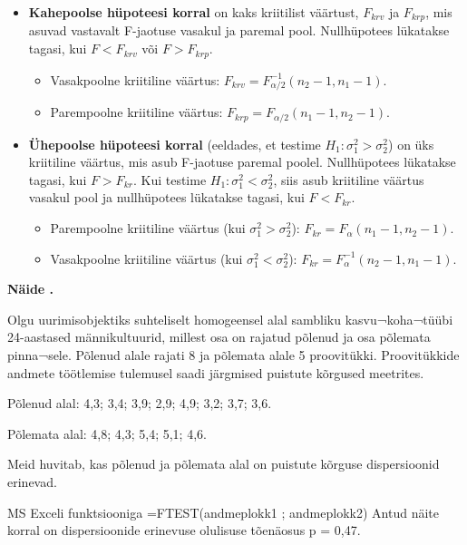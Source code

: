 \documentclass[
]{book}
\providecommand{\tightlist}{%
  \setlength{\itemsep}{0pt}\setlength{\parskip}{0pt}}
\newcounter{naidis}[chapter]
\newenvironment{naidis}
{%
\definecolor{shadecolor}{rgb}{200, 200, 0}
\par\parindent 0pt
\begin{framed}
\begin{naitefont}
\refstepcounter{naidis}\textbf{Näide \thenaidis.}
}
{%
\end{naitefont}%
\end{framed}
}%
\theoremstyle{definition}
\theoremstyle{definition}
\theoremstyle{definition}
\theoremstyle{definition}
\theoremstyle{remark}
\begin{document}
\begin{itemize}
\tightlist
\item
  \textbf{Kahepoolse hüpoteesi korral} on kaks kriitilist väärtust, \(F_{krv}\) ja \(F_{krp}\), mis asuvad vastavalt F-jaotuse vasakul ja paremal pool. Nullhüpotees lükatakse tagasi, kui \(F < F_{krv}\) või \(F > F_{krp}\).

  \begin{itemize}
  \tightlist
  \item
    Vasakpoolne kriitiline väärtus: \(F_{krv} = F^{-1}_{\alpha/2}(n_2 - 1, n_1 - 1)\).
  \item
    Parempoolne kriitiline väärtus: \(F_{krp} = F_{\alpha/2}(n_1 - 1, n_2 - 1)\).
  \end{itemize}
\item
  \textbf{Ühepoolse hüpoteesi korral} (eeldades, et testime \(H_1: \sigma_1^2 > \sigma_2^2\)) on üks kriitiline väärtus, mis asub F-jaotuse paremal poolel. Nullhüpotees lükatakse tagasi, kui \(F > F_{kr}\). Kui testime \(H_1: \sigma_1^2 < \sigma_2^2\), siis asub kriitiline väärtus vasakul pool ja nullhüpotees lükatakse tagasi, kui \(F<F_{kr}\).

  \begin{itemize}
  \tightlist
  \item
    Parempoolne kriitiline väärtus (kui \(\sigma_1^2 > \sigma_2^2\)): \(F_{kr} = F_{\alpha}(n_1 - 1, n_2 - 1)\).
  \item
    Vasakpoolne kriitiline väärtus (kui \(\sigma_1^2 < \sigma_2^2\)): \(F_{kr} = F^{-1}_{\alpha}(n_2 - 1, n_1 - 1)\).
  \end{itemize}
\end{itemize}

\begin{naidis}
Olgu uurimisobjektiks suhteliselt homogeensel alal sambliku kasvu¬koha¬tüübi 24-aastased männikultuurid, millest osa on rajatud põlenud ja osa põlemata pinna¬sele. Põlenud alale rajati 8 ja põlemata alale 5 proovitükki. Proovitükkide andmete töötlemise tulemusel saadi järgmised puistute kõrgused meetrites.

Põlenud alal: 4,3; 3,4; 3,9; 2,9; 4,9; 3,2; 3,7; 3,6.

Põlemata alal: 4,8; 4,3; 5,4; 5,1; 4,6.
\end{naidis}

Meid huvitab, kas põlenud ja põlemata alal on puistute kõrguse dispersioonid erinevad.

MS Exceli funktsiooniga
=FTEST(andmeplokk1 ; andmeplokk2)
Antud näite korral on dispersioonide erinevuse olulisuse tõenäosus p = 0,47.
\end{document}
